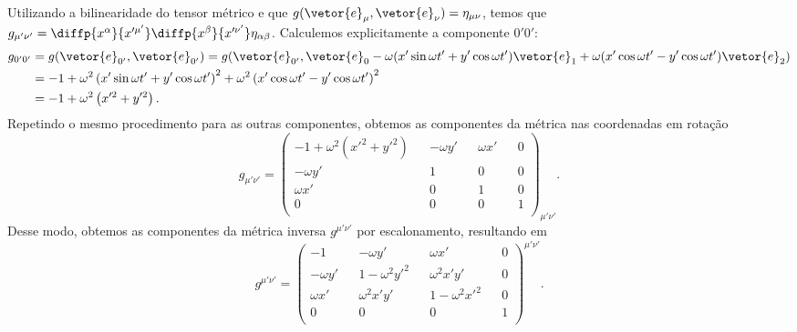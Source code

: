 Utilizando a bilinearidade do tensor métrico e que \(g(\vetor{e}_\mu, \vetor{e}_\nu) = \eta_{\mu\nu}\), temos que \(g_{\mu'\nu'} = \diffp{x^\alpha}{x'^{\mu'}}\diffp{x^\beta}{x'^{\nu'}}\eta_{\alpha\beta}\). Calculemos explicitamente a componente \(0'0'\):
\begin{align*}
    g_{0'0'} &= g(\vetor{e}_{0'}, \vetor{e}_{0'}) = g(\vetor{e}_{0'},\vetor{e}_0 - \omega(x' \sin{\omega t'} + y' \cos{\omega t'})\vetor{e}_1 + \omega(x' \cos{\omega t'} - y'\cos{\omega t'})\vetor{e}_2)\\
             &= -1 + \omega^2\left(x' \sin \omega t' + y' \cos\omega t'\right)^2 + \omega^2\left(x'\cos\omega t' - y' \cos\omega t'\right)^2\\
             &= -1 + \omega^2\left(x'^2 + y'^2\right).
\end{align*}
Repetindo o mesmo procedimento para as outras componentes, obtemos as componentes da métrica nas coordenadas em rotação
\begin{equation*}
    g_{\mu'\nu'} = \begin{pmatrix}
        -1 + \omega^2(x'^2 + y'^2) && -\omega y' && \omega x' && 0\\
        -\omega y' && 1 && 0 && 0\\
        \omega x' && 0 && 1 && 0\\
        0 && 0 && 0 && 1\\
    \end{pmatrix}_{\mu'\nu'}.
\end{equation*}
Desse modo, obtemos as componentes da métrica inversa \(g^{\mu'\nu'}\) por escalonamento, resultando em
\begin{equation*}
    g^{\mu'\nu'} = \begin{pmatrix}
        -1 && -\omega y' && \omega x' && 0\\
        -\omega y' && 1-\omega^2 y'^2 && \omega^2x'y' && 0\\
        \omega x' && \omega^2x'y' && 1-\omega^2 x'^2 && 0\\
        0 && 0 && 0 && 1\\
    \end{pmatrix}^{\mu'\nu'}.
\end{equation*}
